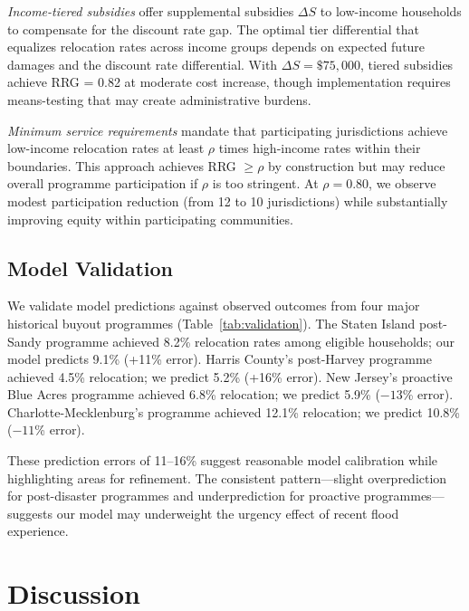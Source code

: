 \documentclass[preprint,12pt,authoryear]{elsarticle}
\begin{document}
\textit{Income-tiered subsidies} offer supplemental subsidies $\Delta S$ to low-income households to compensate for the discount rate gap. The optimal tier differential that equalizes relocation rates across income groups depends on expected future damages and the discount rate differential. With $\Delta S = \$75,000$, tiered subsidies achieve RRG = 0.82 at moderate cost increase, though implementation requires means-testing that may create administrative burdens.

\textit{Minimum service requirements} mandate that participating jurisdictions achieve low-income relocation rates at least $\rho$ times high-income rates within their boundaries. This approach achieves RRG $\geq \rho$ by construction but may reduce overall programme participation if $\rho$ is too stringent. At $\rho = 0.80$, we observe modest participation reduction (from 12 to 10 jurisdictions) while substantially improving equity within participating communities.

\subsection{Model Validation}

We validate model predictions against observed outcomes from four major historical buyout programmes (Table~\ref{tab:validation}). The Staten Island post-Sandy programme achieved 8.2\% relocation rates among eligible households; our model predicts 9.1\% (+11\% error). Harris County's post-Harvey programme achieved 4.5\% relocation; we predict 5.2\% (+16\% error). New Jersey's proactive Blue Acres programme achieved 6.8\% relocation; we predict 5.9\% ($-13$\% error). Charlotte-Mecklenburg's programme achieved 12.1\% relocation; we predict 10.8\% ($-11$\% error).

These prediction errors of 11--16\% suggest reasonable model calibration while highlighting areas for refinement. The consistent pattern---slight overprediction for post-disaster programmes and underprediction for proactive programmes---suggests our model may underweight the urgency effect of recent flood experience.


\section{Discussion}\label{sec:discussion}
\end{document}
